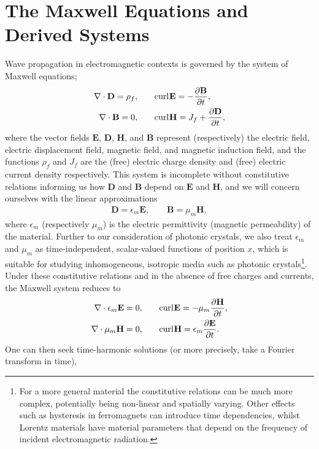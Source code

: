 \section{The Maxwell Equations and Derived Systems} \label{sec:Intro-Maxwell}
Wave propagation in electromagnetic contexts is governed by the system of Maxwell equations; 
\begin{align*}
	\nabla\cdot \mathbf{D} = \rho_f, &\qquad
	\mathrm{curl}_{}\mathbf{E} = -\dfrac{\partial \mathbf{B}}{\partial t}, \\
	\nabla\cdot \mathbf{B} = 0, &\qquad
	 \mathrm{curl}_{}\mathbf{H} = J_f + \dfrac{\partial \mathbf{D}}{\partial t},
\end{align*}
where the vector fields $\mathbf{E}$, $\mathbf{D}$, $\mathbf{H}$, and $\mathbf{B}$ represent (respectively) the electric field, electric displacement field, magnetic field, and magnetic induction field, and the functions $\rho_f$ and $J_f$ are the (free) electric charge density and (free) electric current density respectively.
This system is incomplete without constitutive relations informing us how $\mathbf{D}$ and $\mathbf{B}$ depend on $\mathbf{E}$ and $\mathbf{H}$, and we will concern ourselves with the linear approximations
\begin{align*}
	\mathbf{D} = \epsilon_m \mathbf{E}, \qquad \mathbf{B} = \mu_{m}\mathbf{H},
\end{align*}
where $\epsilon_m$ (respectively $\mu_m$) is the electric permittivity (magnetic permeability) of the material.
Further to our consideration of photonic crystals, we also treat $\epsilon_m$ and $\mu_m$ as time-independent, scalar-valued functions of position $x$, which is suitable for studying inhomogeneous, isotropic media such as photonic crystals\footnote{For a more general material the constitutive relations can be much more complex, potentially being non-linear and spatially varying. 
Other effects such as hysteresis in ferromagnets can introduce time dependencies, whilst Lorentz materials have material parameters that depend on the frequency of incident electromagnetic radiation.}.
Under these constitutive relations and in the absence of free charges and currents, the Maxwell system reduces to
\begin{align*}
	\nabla\cdot \epsilon_m \mathbf{E} = 0, &\qquad
	\mathrm{curl}_{}\mathbf{E} = -\mu_m\dfrac{\partial \mathbf{H}}{\partial t}, \\
	\nabla\cdot \mu_m \mathbf{H} = 0, &\qquad
	\mathrm{curl}_{}\mathbf{H} = \epsilon_m \dfrac{\partial \mathbf{E}}{\partial t}.
\end{align*}
One can then seek time-harmonic solutions (or more precisely, take a Fourier transform in time), 

